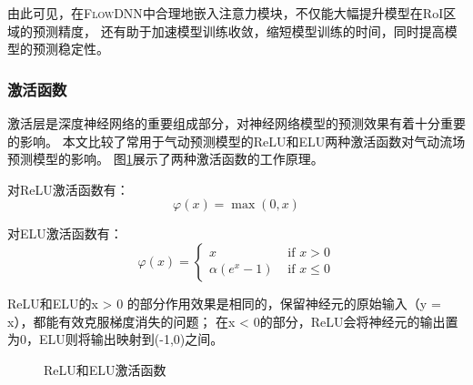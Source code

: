 由此可见，在\textsc{FlowDNN}中合理地嵌入注意力模块，不仅能大幅提升模型在RoI区域的预测精度，
还有助于加速模型训练收敛，缩短模型训练的时间，同时提高模型的预测稳定性。


\subsubsection{激活函数}\label{ac_effect}
激活层是深度神经网络的重要组成部分，对神经网络模型的预测效果有着十分重要的影响。
本文比较了常用于气动预测模型的ReLU和ELU两种激活函数对气动流场预测模型的影响。
图\ref{fig:activation_intro}展示了两种激活函数的工作原理。

对ReLU激活函数有：
\begin{equation}
\varphi(x)=\max (0, x)
\end{equation}

\noindent 对ELU激活函数有：
\begin{equation}
\varphi(x)=\left\{\begin{array}{ll}
x & \text { if } x>0 \\
\alpha\left(e^{x}-1\right) & \text { if } x \leq 0
\end{array}\right.
\end{equation}

\noindent ReLU和ELU的x > 0 的部分作用效果是相同的，保留神经元的原始输入（y = x），都能有效克服梯度消失的问题\cite{2010Rectified}；
在x < 0的部分，ReLU会将神经元的输出置为0，ELU则将输出映射到(-1,0)之间。


\begin{figure}[htb]
	\centering
	 \qquad
	\caption{ReLU和ELU激活函数}
	\label{fig:activation_intro}
\end{figure}


